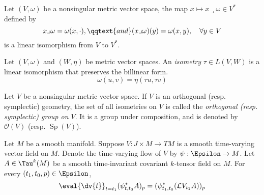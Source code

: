 \documentclass[../main-v2-manifolds.tex]{subfiles}
\begin{document}
    
    
\begin{wts}
    Let $(V,\omega)$ be a nonsingular metric vector space, the map $x\mapsto x\lrcorner \omega\in V^*$ defined by
    \[
        x\lrcorner\omega = \omega(x,\cdot),\qqtext{and}(x\lrcorner\omega)(y) = \omega(x,y),\quad\forall y\in V
    \]
    is a linear isomorphism from $V$ to $V^*$. 
\end{wts}

\begin{definition}
    Let $(V,\omega)$ and $(W, \eta)$ be metric vector spaces. An \emph{isometry} $\tau\in L(V,W)$ is a linear isomorphism that preserves the billinear form.
    \[
        \omega(u,v) = \eta(\tau u, \tau v)
    \]
\end{definition}
\begin{definition}
    Let $V$ be a nonsingular metric vector space. If $V$ is an orthogonal (resp. symplectic) geometry, the set of all isometries on $V$ is called the \emph{orthogonal (resp. symplectic) group on $V$}. It is a group under composition, and is denoted by $\mathcal{O}(V)$ (resp. $\operatorname{Sp}(V)$).
\end{definition}





\begin{wts}\label{lee-chp22:prop-22.14}
    Let $M$ be a smooth manifold. Suppose $V: J\times M\to TM$ is a smooth time-varying vector field on $M$. Denote the time-varying flow of $V$ by $\psi:\Epsilon\to M$. Let $A\in \Tau^k(M)$ be a smooth time-invariant covariant $k$-tensor field on $M$. For every $(t_1, t_0, p)\in \Epsilon$,
    \begin{equation}\label{prop-22.14-eq-1}
        \eval{\dv{t}}_{t=t_1}(\psi^*_{t,t_0}A)_p = (\psi^*_{t_1,t_0}(\mathcal{L}V_{t_1} A))_p
    \end{equation}
\end{wts}
\end{document}
